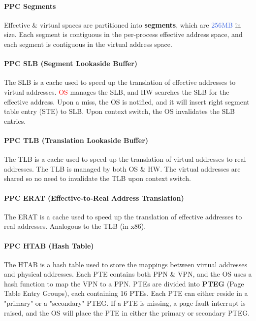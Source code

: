 \documentclass[openany,12pt]{book}
\newcommand{\red}[1]{\textcolor{Red}{#1}}
\newcommand{\blue}[1]{\textcolor{RoyalBlue}{#1}}
\begin{document}
\paragraph{PPC Segments} Effective \& virtual spaces are partitioned into \textbf{segments}, which are \blue{256MB} in size. Each segment is contiguous in the per-process effective address space, and each segment is contiguous in the virtual address space. 


\paragraph{PPC SLB (Segment Lookaside Buffer)} The SLB is a cache used to speed up the translation of effective addresses to virtual addresses. \red{OS} manages the SLB, and HW searches the SLB for the effective address. Upon a miss, the OS is notified, and it will insert right segment table entry (STE) to SLB. Upon context switch, the OS invalidates the SLB entries. 

\paragraph{PPC TLB (Translation Lookaside Buffer)} The TLB is a cache used to speed up the translation of virtual addresses to real addresses. The TLB is managed by both OS \& HW. The virtual addresses are shared so no need to invalidate the TLB upon context switch.

\paragraph{PPC ERAT (Effective-to-Real Address Translation)} The ERAT is a cache used to speed up the translation of effective addresses to real addresses. Analogous to the TLB (in x86). 

\paragraph{PPC HTAB (Hash Table)} The HTAB is a hash table used to store the mappings between virtual addresses and physical addresses. Each PTE contains both PPN \& VPN, and the OS uses a hash function to map the VPN to a PPN. PTEs are divided into \textbf{PTEG} (Page Table Entry Groups), each containing 16 PTEs. Each PTE can either reside in a "primary" or a "secondary" PTEG. If a PTE is missing, a page-fault interrupt is raised, and the OS will place the PTE in either the primary or secondary PTEG.
\end{document}
